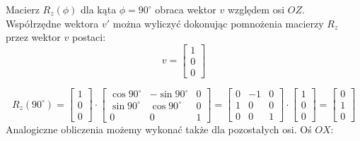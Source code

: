 \begin{przyklad}
    
Macierz $R_{z}(\phi)$ dla kąta $\phi = 90^{\circ}$ obraca wektor $v$ względem osi $OZ$. Współrzędne wektora $v'$ można wyliczyć dokonując pomnożenia macierzy $R_{z}$ przez wektor $v$ postaci:
\begin{equation*}
v = 
    \begin{bmatrix}
    1 \\
    0 \\
    0
    \end{bmatrix}
\end{equation*}

\begin{equation*}
 R_{z}(90^{\circ}) = 
\begin{bmatrix}
    1 \\
    0 \\ 
    0
    \end{bmatrix}
    \cdot
    \begin{bmatrix}
\cos90^{\circ} & -\sin 90^{\circ} &  0 \\
\sin 90^{\circ} & \cos 90^{\circ} &  0 \\
0 & 0 & 1
    \end{bmatrix}
    = 
    \begin{bmatrix}
    0 & -1 & 0 \\
    1 & 0 & 0 \\
    0 & 0 & 1
    \end{bmatrix}
    \cdot
    \begin{bmatrix}
    1 \\
    0 \\
    0
    \end{bmatrix}
    =
    \begin{bmatrix}
    0 \\
    1 \\
    0
    \end{bmatrix}
\end{equation*}
Analogiczne obliczenia możemy wykonać także dla pozostałych osi.
Oś $OX$:


\end{przyklad}
